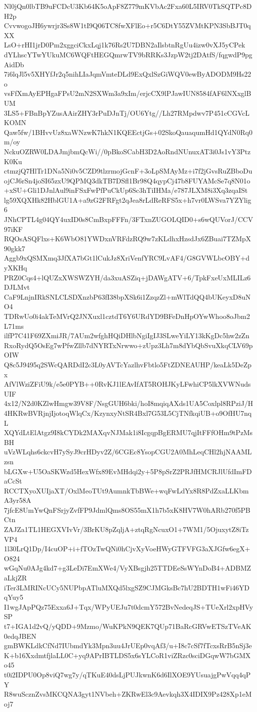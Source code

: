 Nl0jQn0lbTB9uFCDcU3Kb64K5oApF8Z779mKVbAc2Fxa60L5IRV0TkSQTPc8DH2p
CvvwogoJH6ywrjr3Ss8W1tI9Q06TC8fwXFlEo+r5C6DtY55ZVMtKPN3SbBJT0qXX
LsO+rHI1jrD0Pm2xggciCkxLqj1k76Rs2U7DBN2aIlsbtnRgUu4izw0vXJ5yCPek
dYLhscYTwYUkuMC6WQFtHEGQmrwTV9bRRKs3JzpW2tj2DAtfS/fqgwdP9pgAidDb
7i6lqJl5v5XHYfJr2q5nihLIaJqmVmteDLd9ExQxlSzGiWQV0ewByADODM9Hs22o
vsFfXmAyEPHgaFPsU2mN2SXWm3a9xIm/erjcCX9lPJawIUN8584fAF6lNXxglBUM
3LS5+FBnBpYZusAAirZHY3rPuDJnTj/OU6Ytg//Lh27RMpdwv7P451cCGVcLKOMN
Qaw5fw/1BHvvUz8xaWNzwK7hkN1KQEEctjGs+02SkoQauaqumHd1QYdN0Rq0m/oy
NckuOZRW0LDAJmjbmQcWi//0pBkoSCabH3D2AoRndNUnuxAT3i0Js1vY3PtzK0Ku
ctmzjQ7HlTr1DNa5Ni0v5CZD9tlzrmojGcnF+3oLpSMAyMz+i7f2jGvsRuZBboDu
ojCJ6rSn4joSI65zxU9QPMQ3dkTB7DSfl1Br98Q4qypCj47b8FUYAMcSe7q8N01o
+xSU+Gli1DJnlAul9inFSxFwPfPuCkUp6Sc3hTiIHMa/e787JLXM8i3Xq3zqaISt
lg59XQXHk82HblGU1A+a9zG2FRFgt2qJea8rLdReRFS5x+h7vr0LWSva7YZYlig6
JNhCPTL4g04QY4uxID0s8CmBxpFFFn/3FTxnZUGOLQID0+s6wQUVorJ/CCV97iKF
RQOsASQFlxs+K6WbO81YWDxnVRFdzRQ9w7zKLdhxHzsdJx6ZBuai7TZMpX90gkk7
Aggb9xQSMXmq3JfXA7bGt1lCukJz8XriVenfYRC9LvAF4/G8GVWLbcOBY+dyXKHq
PRZ0Cqs4+lQUZxXWSWZYH/da3xuASZiq+jDAWgATV+6/TpkFxeUxMLILz6DJLMvt
CaF9LnjnIRkSNLCLSDXnzbP63fI38bpXSk6i1ZzqzZl+mWlTdQQ4bUKeyxD8uNO4
TDRwUo0i4akTeMVrQ2JNXuxl1cztdT6Y6URdYD9BFeDnHpOYwWhoo8oJbm2L71ms
ilfP7C41F69ZXmiJR/7AUm2wfghHQiDHlbNgiIgIJ3SLweYiLY13kKgDc5hw2zZn
RxoRydQ5OsEg7wPfwZllb7dNYRTxNrwwo+zUpz3Lh7m8dYbQbSvuXkqCLV69pOIW
Q8c5J9495q2SWcQARDdI2c3L0yAVTcYazlhvFbtlo5FtZDNEAUHP/keaLk5DeZpx
AfVlWziZFiU9k/e5e0PYB++0RvKJ1lEAvIfAT5ROHJKyLFwhiCP5lkXVWNudsUIF
4x12/N2d0KZlwHmgw39V8F/NsgGUH6bki/hoI8mqiqAXds1UA5Coxlpl8RPziJ/H
4HKRwBVRjnjIjotoqWlqCx/KzynxyNtSR4Bxl7G53L5CjTNfkqiUB+o9OfHU7nqL
XQYdLtElAtgz9I8kCYDk2MAXqvNJMak1i8IcgqpBgERMU7qjItFFfOHm9tPzMsBH
uVzWLqhs6ckcvH7ySyJ9crHDyv2Z/6CGEc8YsopCGU2A0MhLeqCHl2hjNAAMLzsn
bLGXw+U5OaSKWzd5HexWfx89EvMHdqi2y+5P8pSrZ2PRJfHMCRJlUfdImFDaCcSt
RCCTXyoXUIjaXT/OxlMeoTUt9AumnkTbBWe+wqFwLdYx8R8PdZxaLLKbmA3yr58A
7jfcE8UmYwQnFSrjyZvfFP9JdmlQms8OS55mX1h7b5xK8HV7W0hARb270f5PBCtn
ZAJZa1TL1HEGXVIvVr/3BrKU8pZqljA+ztqRgNcuxO1+7WM1/5OjuxytZ8iTzVP4
1l30LrQ1Dp/I4cuOP+i+fTOzTwQNi0hCjvXyVoeHWyGTFVFG3aXJGfw6egX+O824
wGqNu0AJg4kd7+g3LeDi7EmXWe4/VyXBsgjh25TTDEeSsWYnDoB4+ADBMZaLkjZR
iTer3LMRINcUCy5NUPbpATluMXQd5lxgSZ9CJMGksBc7hU2BDTH1wFi46YDqYuy5
I1wgJApPQz75Exxa6J+Tqx/WPyUEJu7t0dcmY572BvNedeqJS+TUeXrl2xpHVySP
t7+IGA1d2vQ/yQDD+9Mzmo/WuKPkN9QEK7QUp71BaRcGRVwETSzTVeAK0edqJBEN
gmBWKLdkCfNd7IUbmdYk3Mpn3uu4JrUEp0vqAf3/u+I8c7cSf7fTcxsRrB5nSj3e
K+b16XxdmtfjlaLL0C+yq9APrIBTLDS5x6sYLCoR1viZRzc0sciDGqwW7bGMXo45
t0i2IDPU0Op8viQ7wg7y/qTKuE40dsLjPUJkwnK6d6IlXOE9YUsuajgPwVqq4qPY
R8wuScznZvsMKCQNA3gyt1NVbeh+ZKRwEl3c9Aevkqh3X4IDIX9Pz428Xp1eMoj7
